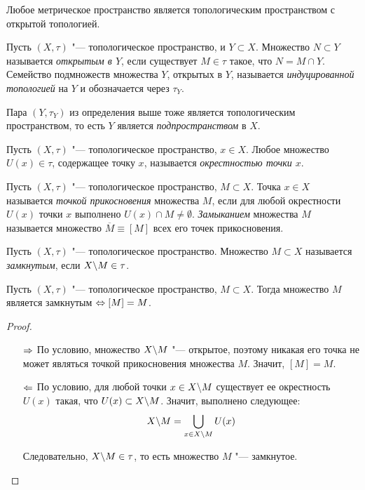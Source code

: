 \begin{note}
	Любое метрическое пространство является топологическим пространством с открытой топологией.
\end{note}

\begin{definition}
	Пусть $(X, \tau)$ "--- топологическое пространство, и $Y \subset X$. Множество ${N \subset Y}$ называется \textit{открытым в $Y$}, если существует $M \in \tau$ такое, что $N = M \cap Y$. Семейство подмножеств множества $Y$, открытых в $Y$, называется \textit{индуцированной топологией} на $Y$ и обозначается через $\tau_Y$.
\end{definition}

\begin{note}
	Пара $(Y, \tau_Y)$ из определения выше тоже является топологическим пространством, то есть $Y$ является \textit{подпространством} в $X$.
\end{note}

\begin{definition}
	Пусть $(X, \tau)$ "--- топологическое пространство, $x \in X$. Любое множество $U(x) \in \tau$, содержащее точку $x$, называется \textit{окрестностью точки $x$}.
\end{definition}

\begin{definition}
	Пусть $(X, \tau)$ "--- топологическое пространство, $M \subset X$. Точка $x \in X$ называется \textit{точкой прикосновения} множества $M$, если для любой окрестности $U(x)$ точки $x$ выполнено $U(x) \cap M \ne \emptyset$. \textit{Замыканием} множества $M$ называется множество $\overline M \equiv [M]$ всех его точек прикосновения.
\end{definition}

\begin{definition}
	Пусть $(X, \tau)$ "--- топологическое пространство. Множество $M \subset X$ назы\-вается \textit{замкнутым}, если $X \backslash M \in \tau$.
\end{definition}

\begin{theorem}
	Пусть $(X, \tau)$ "--- топологическое пространство, $M \subset X$. Тогда множество $M$ является замкнутым $\Leftrightarrow [M] = M$.
\end{theorem}

\begin{proof}~
	\begin{itemize}
		\item[$\Rightarrow$] По условию, множество $X \backslash M$ "--- открытое, поэтому никакая его точка не может являться точкой прикосновения множества $M$. Значит, $[M] = M$.
		
		\item[$\Leftarrow$] По условию, для любой точки $x \in X \backslash M$ существует ее окрестность $U(x)$ такая, что $U(x) \subset X \backslash M$. Значит, выполнено следующее:
		\[X \backslash M = \bigcup_{x \in X \backslash M} U(x)\]
		
		Следовательно, $X \backslash M \in \tau$, то есть множество $M$ "--- замкнутое. \qedhere
	\end{itemize}
\end{proof}

